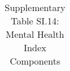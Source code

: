 \begin{longtable}{llcccccccccc}
\caption{Supplementary Table SI.14: Mental Health Index Components} \label{tab:pap__b4_1} \\                                                                                                                                                                                                                                                                                                                                                                                                                                                                                                                                                                                                                                                                                                                                                                                              
\hline \hline                                                                                                                                                                                                                                                                                                                                                                                                                                                                                                                                                                                                                                                                                                                                                                                                                                                                             

\end{longtable}
